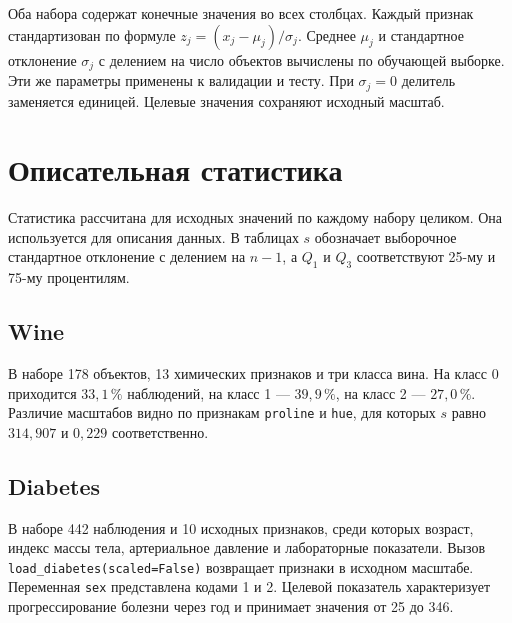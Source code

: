 Оба набора содержат конечные значения во всех столбцах. Каждый признак
стандартизован по формуле \(z_j=(x_j-\mu_j)/\sigma_j\).
Среднее \(\mu_j\) и стандартное отклонение \(\sigma_j\) с делением на
число объектов вычислены по обучающей выборке. Эти же параметры применены
к валидации и тесту. При \(\sigma_j=0\) делитель заменяется единицей.
Целевые значения сохраняют исходный масштаб.

\clearpage
\section{Описательная статистика}

Статистика рассчитана для исходных значений по каждому набору целиком.
Она используется для описания данных. В таблицах \(s\) обозначает
выборочное стандартное отклонение с делением на \(n-1\), а \(Q_1\) и \(Q_3\)
соответствуют 25-му и 75-му процентилям.

\subsection{Wine}

В наборе 178 объектов, 13 химических признаков и три класса вина.
На класс 0 приходится \(33{,}1\,\%\) наблюдений, на класс 1 --- \(39{,}9\,\%\),
на класс 2 --- \(27{,}0\,\%\). Различие масштабов видно по признакам
\texttt{proline} и \texttt{hue}, для которых \(s\) равно \(314{,}907\)
и \(0{,}229\) соответственно.


\clearpage
\subsection{Diabetes}

В наборе 442 наблюдения и 10 исходных признаков, среди которых возраст,
индекс массы тела, артериальное давление и лабораторные показатели.
Вызов \texttt{load\_diabetes(scaled=False)} возвращает признаки в исходном
масштабе. Переменная \texttt{sex} представлена кодами 1 и 2.
Целевой показатель характеризует прогрессирование болезни через год
и принимает значения от 25 до 346.


